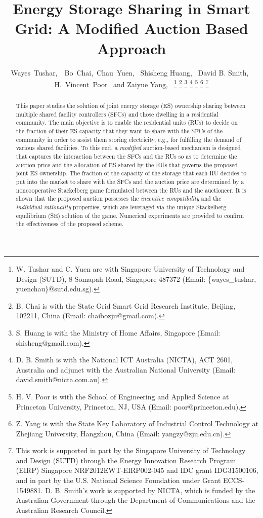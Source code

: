 \documentclass[journal,10pt]{IEEEtran}
\begin{document}
\title{Energy Storage Sharing in Smart Grid: A Modified Auction Based Approach}
\author{Wayes~Tushar,~~Bo~Chai,~Chau~Yuen,~
 Shisheng Huang,~
David B. Smith,~ H.~Vincent~Poor~ and Zaiyue Yang,~
\thanks{W. Tushar and C. Yuen are with Singapore University of Technology and Design (SUTD), 8 Somapah Road, Singapore 487372 (Email: \{wayes\_tushar, yuenchau\}@sutd.edu.sg).}
\thanks{B. Chai is with the State Grid Smart Grid Research Institute, Beijing, 102211, China (Email: chaibozju@gmail.com).}
\thanks{S. Huang is with the Ministry of Home Affairs, Singapore (Email: shisheng@gmail.com).}
\thanks{D. B. Smith is with the National ICT Australia (NICTA), ACT 2601, Australia and adjunct with the Australian National University (Email: david.smith@nicta.com.au).}
\thanks{H. V. Poor is with the School of Engineering and Applied Science at Princeton University, Princeton, NJ, USA (Email: poor@princeton.edu).}
\thanks{Z. Yang is with the State Key Laboratory of Industrial Control Technology at Zhejiang University, Hangzhou, China (Email: yangzy@zju.edu.cn).}
\thanks{This work is supported in part by the Singapore University of Technology and Design (SUTD) through the Energy Innovation Research Program (EIRP) Singapore NRF2012EWT-EIRP002-045 and IDC grant IDG31500106, and in part by the U.S. National Science Foundation under Grant ECCS-1549881. D. B. Smith's work is supported by NICTA, which is funded by the Australian Government through the Department of Communications and the Australian Research Council.}
}
\IEEEoverridecommandlockouts
\maketitle
\begin{abstract}
This paper studies the solution of joint energy storage (ES) ownership sharing between multiple shared facility controllers (SFCs) and those dwelling in a residential community. The main objective is to enable the residential units (RUs) to decide on the fraction of their ES capacity that they want to share with the SFCs of the community in order to assist them storing electricity, e.g., for fulfilling the demand of various shared facilities. To this end, a \emph{modified} auction-based mechanism is designed that captures the interaction between the SFCs and the RUs so as to determine the auction price and the allocation of ES shared by the RUs that governs the proposed joint ES ownership. The fraction of the capacity of the storage that each RU decides to put into the market to share with the SFCs and the auction price are determined by a noncooperative Stackelberg game formulated between the RUs and the auctioneer. It is shown that the proposed auction possesses the \emph{incentive compatibility} and the \emph{individual rationality} properties, which are leveraged via the unique Stackelberg equilibrium (SE) solution of the game. Numerical experiments are provided to confirm the effectiveness of the proposed scheme.
\end{abstract}
\end{document}
